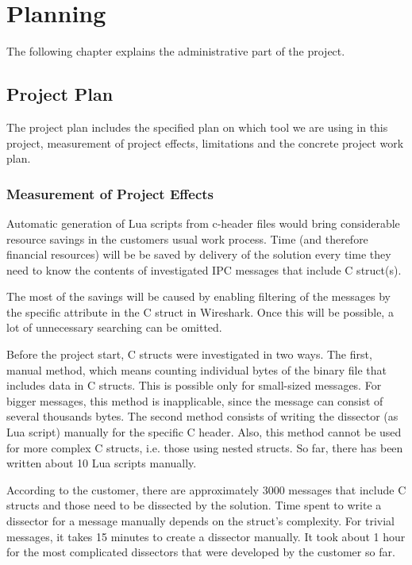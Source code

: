 \chapter{Planning}
The following chapter explains the administrative part of the project.

\section{Project Plan}
The project plan includes the specified plan on which tool we are using in this project, measurement of project effects, limitations and the concrete project work plan.

\subsection{Measurement of Project Effects}
Automatic generation of Lua scripts from c-header files would bring considerable resource savings in the customers usual work process. Time (and therefore financial resources) will be  be saved by delivery of the solution every time they need to know the contents of investigated IPC messages that include C struct(s).

The most of the savings will be caused by enabling filtering of the messages by the specific attribute in the C struct in Wireshark. Once this will be possible, a lot of unnecessary searching can be omitted.

Before the project start, C structs were investigated in two ways. The first, manual method, which means counting individual bytes of the binary file that includes data in C structs. This is possible only for small-sized messages. For bigger messages, this method is inapplicable, since the message can consist of several thousands bytes. The second method consists of writing the dissector (as Lua script) manually for the specific C header. Also, this method cannot be used for more complex C structs, i.e. those using nested structs. So far, there has been written about 10 Lua scripts manually.

According to the customer, there are approximately 3000 messages that include C structs and those need to be dissected by the solution. Time spent to write a dissector for a message manually depends on the struct’s complexity. For trivial messages, it takes 15 minutes to create a dissector manually. It took about 1 hour for the most complicated dissectors that were developed by the customer so far.


